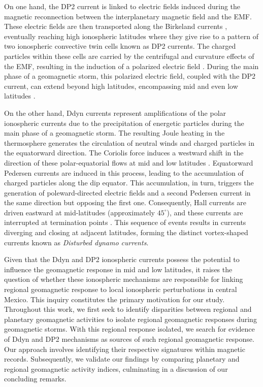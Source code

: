 \documentclass[a4paper,fleqn]{cas-dc}
\begin{document}
On one hand, the DP2 current is linked to electric fields induced during the magnetic reconnection between the interplanetary magnetic field and the EMF. These electric fields are then transported along the Birkeland currents \citep{dp2PPEF, dp2_diag}, eventually reaching high ionospheric latitudes where they give rise to a pattern of two ionospheric convective twin cells known as DP2 currents. The charged particles within these cells are carried by the centrifugal and curvature effects of the EMF, resulting in the induction of a polarized electric field \citep{Hepner_a, Hepner_b, Pudovkin, blanc_caudal, Denisenko}. During the main phase of a geomagnetic storm, this polarized electric field, coupled with the DP2 current, can extend beyond high latitudes, encompassing mid and even low latitudes \citep{nishida_66_knee, nishida_68_coherence, nishida_andobayashi_67}.

On the other hand, Ddyn currents represent amplifications of the polar ionospheric currents due to the precipitation of energetic particles during the main phase of a geomagnetic storm. The resulting Joule heating in the thermosphere generates the circulation of neutral winds and charged particles in the equatorward direction. The Coriolis force induces a westward shift in the direction of these polar-equatorial flows at mid and low latitudes \citep{blanc_ddyn, ddyn2005, angeoddyn}. Equatorward Pedersen currents are induced in this process, leading to the accumulation of charged particles along the dip equator. This accumulation, in turn, triggers the generation of poleward-directed electric fields and a second Pedersen current in the same direction but opposing the first one. Consequently, Hall currents are driven eastward at mid-latitudes (approximately $45^\circ$), and these currents are interrupted at termination points \citep{blanc_ddyn}. This sequence of events results in currents diverging and closing at adjacent latitudes, forming the distinct vortex-shaped currents known as \emph{Disturbed dynamo currents}.

Given that the Ddyn and DP2 ionospheric currents possess the potential to influence the geomagnetic response in mid and low latitudes, it raises the question of whether these ionospheric mechanisms are responsible for linking regional geomagnetic response to local ionospheric perturbations in central Mexico. This inquiry constitutes the primary motivation for our study. Throughout this work, we first seek to identify disparities between regional and planetary geomagnetic activities to isolate regional geomagnetic responses during geomagnetic storms. With this regional response isolated, we search for evidence of Ddyn and DP2 mechanisms as sources of such regional geomagnetic response. Our approach involves identifying their respective signatures within magnetic records. Subsequently, we validate our findings by comparing planetary and regional geomagnetic activity indices, culminating in a discussion of our concluding remarks.
\end{document}
